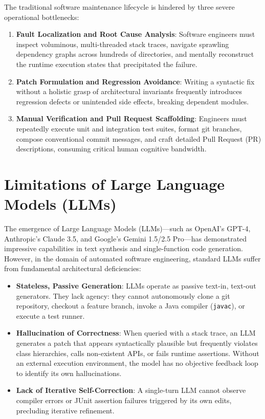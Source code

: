 \documentclass[12pt,a4paper]{report}
\begin{document}
The traditional software maintenance lifecycle is hindered by three severe operational bottlenecks:
\begin{enumerate}
    \item \textbf{Fault Localization and Root Cause Analysis}: Software engineers must inspect voluminous, multi-threaded stack traces, navigate sprawling dependency graphs across hundreds of directories, and mentally reconstruct the runtime execution states that precipitated the failure.
    \item \textbf{Patch Formulation and Regression Avoidance}: Writing a syntactic fix without a holistic grasp of architectural invariants frequently introduces regression defects or unintended side effects, breaking dependent modules.
    \item \textbf{Manual Verification and Pull Request Scaffolding}: Engineers must repeatedly execute unit and integration test suites, format git branches, compose conventional commit messages, and craft detailed Pull Request (PR) descriptions, consuming critical human cognitive bandwidth.
\end{enumerate}

\section{Limitations of Large Language Models (LLMs)}
The emergence of Large Language Models (LLMs)---such as OpenAI's GPT-4, Anthropic's Claude 3.5, and Google's Gemini 1.5/2.5 Pro---has demonstrated impressive capabilities in text synthesis and single-function code generation. However, in the domain of automated software engineering, standard LLMs suffer from fundamental architectural deficiencies:
\begin{itemize}
    \item \textbf{Stateless, Passive Generation}: LLMs operate as passive text-in, text-out generators. They lack agency: they cannot autonomously clone a git repository, checkout a feature branch, invoke a Java compiler (\texttt{javac}), or execute a test runner.
    \item \textbf{Hallucination of Correctness}: When queried with a stack trace, an LLM generates a patch that appears syntactically plausible but frequently violates class hierarchies, calls non-existent APIs, or fails runtime assertions. Without an external execution environment, the model has no objective feedback loop to identify its own hallucinations.
    \item \textbf{Lack of Iterative Self-Correction}: A single-turn LLM cannot observe compiler errors or JUnit assertion failures triggered by its own edits, precluding iterative refinement.
\end{itemize}
\end{document}
